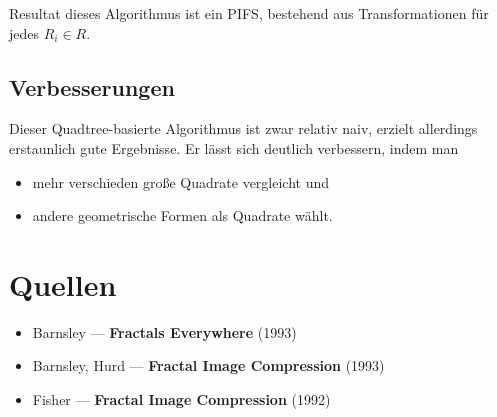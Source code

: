 \documentclass[afourpaper]{latex-classes/handout}
\begin{document}
Resultat dieses Algorithmus ist ein PIFS, bestehend aus Transformationen für jedes \( R_i \in R \).

\subsection{Verbesserungen}

Dieser Quadtree-basierte Algorithmus ist zwar relativ naiv, erzielt allerdings erstaunlich gute Ergebnisse. Er lässt sich deutlich verbessern, indem man

\begin{itemize}
  \item mehr verschieden große Quadrate vergleicht und
  \item andere geometrische Formen als Quadrate wählt.
\end{itemize}


\section{Quellen}

\begin{itemize}
  \item Barnsley --- \textbf{Fractals Everywhere} (1993)
  \item Barnsley, Hurd --- \textbf{Fractal Image Compression} (1993)
  \item Fisher --- \textbf{Fractal Image Compression} (1992)
\end{itemize}
\end{document}

